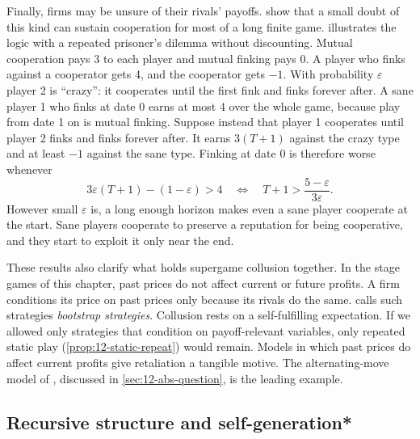 Finally, firms may be unsure of their rivals' payoffs. \citet{KrepsEtAl1982} show that a small doubt of this kind
can sustain cooperation for most of a long finite game. \citet[section~6.5.1]{Tirole1988} illustrates the logic with
a repeated prisoner's dilemma without discounting. Mutual cooperation pays 3 to each player and mutual finking pays
0. A player who finks against a cooperator gets 4, and the cooperator gets $-1$. With probability $\varepsilon$
player 2 is ``crazy'': it cooperates until the first fink and finks forever after. A sane player 1 who finks at date
0 earns at most 4 over the whole game, because play from date 1 on is mutual finking. Suppose instead that
player 1 cooperates until player 2 finks and finks forever after. It earns $3(T + 1)$ against the crazy type and at
least $-1$ against the sane type. Finking at date 0 is therefore worse whenever
\begin{equation*}
3\varepsilon(T + 1) - (1 - \varepsilon) > 4
\quad\Longleftrightarrow\quad
T + 1 > \frac{5 - \varepsilon}{3\varepsilon} .
\end{equation*}
However small $\varepsilon$ is, a long enough horizon makes even a sane player cooperate at the start. Sane players
cooperate to preserve a reputation for being cooperative, and they start to exploit it only near the end.

These results also clarify what holds supergame collusion together. In the stage games of this chapter, past prices
do not affect current or future profits. A firm conditions its price on past prices only because its rivals do the
same. \citet[section~6.3.4.1]{Tirole1988} calls such strategies \emph{bootstrap strategies}. Collusion rests on a
self-fulfilling expectation. If we allowed only strategies that condition on payoff-relevant variables, only
repeated static play (\cref{prop:12-static-repeat}) would remain. Models in which past prices do affect current
profits give retaliation a tangible motive. The alternating-move model of \citet{MaskinTirole1988}, discussed in
\cref{sec:12-abs-question}, is the leading example.

\subsection{Recursive structure and self-generation*}\label{sec:12-aps}

